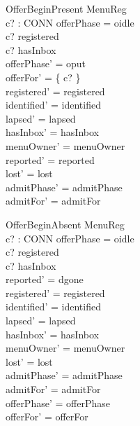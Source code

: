 \documentclass[a4paper,10pt,fleqn]{article}
\begin{document}
\begin{schema}{OfferBeginPresent}
  \Delta MenuReg \\
  c? : CONN
\where
  offerPhase = oidle \\
  c? \in registered \\
  c? \in hasInbox \\
  offerPhase' = oput \\
  offerFor' = \{ c? \} \\
  registered' = registered \\
  identified' = identified \\
  lapsed' = lapsed \\
  hasInbox' = hasInbox \\
  menuOwner' = menuOwner \\
  reported' = reported \\
  lost' = lost \\
  admitPhase' = admitPhase \\
  admitFor' = admitFor
\end{schema}

\begin{schema}{OfferBeginAbsent}
  \Delta MenuReg \\
  c? : CONN
\where
  offerPhase = oidle \\
  c? \in registered \\
  c? \notin hasInbox \\
  reported' = dgone \\
  registered' = registered \\
  identified' = identified \\
  lapsed' = lapsed \\
  hasInbox' = hasInbox \\
  menuOwner' = menuOwner \\
  lost' = lost \\
  admitPhase' = admitPhase \\
  admitFor' = admitFor \\
  offerPhase' = offerPhase \\
  offerFor' = offerFor
\end{schema}
\end{document}
